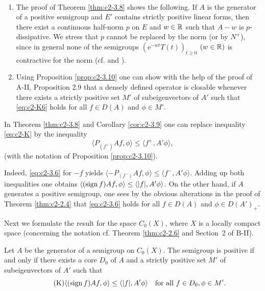 \begin{remark}\label{rem:c2-3.11} ~ 
\begin{enumerate}[\upshape (i), wide, labelindent=.5em]%
\item \label{rem:c2-3.11-1}
The proof of Theorem \ref{thm:c2-3.8}   shows the following. 
If $A$ is the generator of a positive semigroup and $E'$ contains strictly
positive linear forms, then there exist a continuous half-norm $p$ on
$E$ and $w \in \mathbb{R}$ such that $A - w$ is $p$-dissipative. 
We stress that $p$ cannot be replaced by the norm (or by $N^{+}$), since in general none of the semigroups $(\mathrm{e}^{-wt}T(t))_{t \geq 0}$ $(w \in \mathbb{R})$ is contractive for the norm (cf. \citet{derndinger:1984} and \citet{battydavies:1983}).
\item  \label{rem:c2-3.11-2}
Using Proposition \ref{prop:c2-3.10}   one can show with the help of the proof of 
A-II,  Proposition 2.9 that a densely defined operator is closable whenever
there exists a strictly positive set $M'$ of subeigenvectors of $A'$
such that \eqref{eq:c2-K6}   holds for all $f \in D(A)$ and $\phi \in M'$.
\end{enumerate}
\end{remark}
\begin{remark}\label{rem:c2-3.12}
In Theorem \ref{thm:c2-3.8} and Corollary \ref{cor:c2-3.9}  one can replace inequality \eqref{eq:c2-K}   by the inequality
\begin{equation}\label{eq:c2-3.6}
\langle P_{(f^{+})}Af,\phi \rangle \leq \langle f^{+},A'\phi \rangle,
\end{equation}
(with the notation of Proposition \ref{prop:c2-3.10}).

Indeed, \eqref{eq:c2-3.6} for $-f$ yields $\langle -P_{(f^{-})}Af,\phi \rangle \leq \langle f^{-},A'\phi \rangle$. 
Adding up both inequalities one obtains $\langle(\operatorname{sign} f)Af,\phi \rangle \leq \langle |f|,A'\phi \rangle$.
On the other hand, if $A$ generates a positive semigroup, one sees by
the obvious alterations in the proof of Theorem \ref{thm:c2-2.4}   that \eqref{eq:c2-3.6} holds for all $f \in D(A)$ and $\phi \in D(A')_{+}$. 

Next we formulate the result for the space $C_{0}(X)$, where $X$ is a locally compact space (concerning the notation cf. Theorem \ref{thm:c2-2.6} and Section~2 of B-II).
\end{remark}
\begin{theorem}\label{thm:c2-3.13}
Let $A$ be the generator of a semigroup on $C_{0}(X)$.
The semigroup is positive if and only if there exists a core $D_{0}$ of
$A$ and a strictly positive set $M'$ of subeigenvectors of $A'$ such
that
\begin{equation}\label{eq:c2-K7} \tag{K}
\langle(\operatorname{sign} f)Af,\phi \rangle \leq \langle |f|,A'\phi \rangle \quad \text{for all } f \in D_{0}, \phi \in M'.
\end{equation}
\end{theorem}
